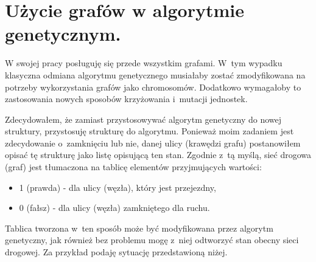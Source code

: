 \documentclass[twoside,12pt]{report}
\begin{document}
\section{Użycie grafów w algorytmie genetycznym.}

W swojej pracy posługuję się przede wszystkim grafami. W~tym wypadku klasyczna odmiana algorytmu genetycznego musiałaby zostać zmodyfikowana na potrzeby wykorzystania grafów jako chromosomów. Dodatkowo wymagałoby to zastosowania nowych sposobów krzyżowania i~mutacji jednostek. 

Zdecydowałem, że zamiast przystosowywać algorytm genetyczny do nowej struktury, przystosuję strukturę do algorytmu. Ponieważ moim zadaniem jest zdecydowanie o~zamknięciu lub nie, danej ulicy (krawędzi grafu) postanowiłem opisać tę strukturę jako listę opisującą ten stan. Zgodnie z~tą myślą, sieć drogowa (graf) jest tłumaczona na tablicę elementów przyjmujących wartości:

\begin{itemize}
\item 1 (prawda) - dla ulicy (węzła), który jest przejezdny,
\item 0 (fałsz) - dla ulicy (węzła) zamkniętego dla ruchu.
\end{itemize}

Tablica tworzona w~ten sposób może być modyfikowana przez algorytm genetyczny, jak również bez problemu mogę z~niej odtworzyć stan obecny sieci drogowej. Za przykład podaję sytuację przedstawioną niżej.
\end{document}
